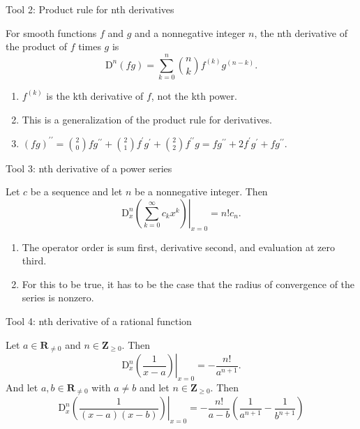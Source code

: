 \documentclass[portrait,fleqn,12pt]{beamer}
\newcommand{\reals}{\mathbf{R}}
\newcommand{\integers}{\mathbf{Z}}
\newcommand{\D}{\mathrm{D}}
\newenvironment{handlist}
   {\begin{enumerate}[\faHandPointRight]
       \addtolength{\itemsep}{0.0\itemsep}}
     {\end{enumerate}}
\begin{document}
\begin{frame}{Tool 2:  Product rule for nth derivatives}

For smooth functions $f$ and $g$ and a nonnegative integer $n$, the nth derivative of the product of $f$ times $g$ is
\begin{equation}
       \D^n (f g) = \sum_{k=0}^n  \binom{n}{k}  f^{(k)} g^{(n-k)}.
\end{equation}
\begin{handlist}
\item $ f^{(k)}$ is the kth derivative of $f$, not the kth power.
\item This is a generalization of the product rule for derivatives.
\item $(f g)^{\prime \prime} = \binom{2}{0} f g^{\prime \prime} + \binom{2}{1} f^\prime  g^{\prime} +
\binom{2}{2} f^{\prime \prime} g  = f g^{\prime \prime} + 2  f^\prime  g^{\prime} + f g^{\prime \prime}$.
\end{handlist}
\end{frame}


\begin{frame}{Tool 3:  nth derivative of a power series}

Let $c$ be a sequence and let $n$ be a nonnegative integer.  Then
\begin{equation}
      \left.  \D^n_x \left( \sum_{k=0}^\infty c_k x^k  \right)  \right \vert_{x=0} = n!  c_n.
\end{equation}
\begin{handlist}
 \item The operator order is sum first, derivative second, and  evaluation at zero third.
   \item For this to be true, it has to be the case that  the radius of convergence of the series is nonzero.
\end{handlist}
\end{frame}

\begin{frame}{Tool 4:   nth derivative of a rational function}

Let $a \in \reals_{\neq 0} $ and $n \in \integers_{\geq 0}$. Then
\begin{equation*}
      \left.  \D^n_x \left(\frac{1}{x-a}  \right) \right \vert_{x=0} = -\frac{n!}{a^{n+1}}.
\end{equation*}
And let $a,b \in \reals_{\neq 0} $ with $a \neq b$  and let $n \in \integers_{\geq 0}$. Then
\begin{equation*}
      \left.  \D^n_x \left(\frac{1}{(x-a)(x-b)}  \right) \right \vert_{x=0} = -\frac{n!}{a-b} \left(\frac{1}{a^{n+1}} - \frac{1}{b^{n+1}} \right)
\end{equation*}
\end{frame}
\end{document}
